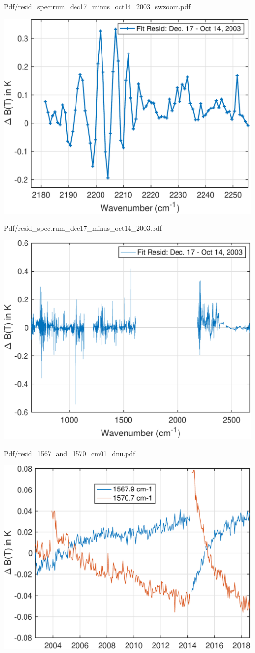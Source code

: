 \documentclass[presentation]{beamer}
\begin{document}
\begin{frame}[label={sec:org6f90b9b}]{Pdf/resid\_spectrum\_dec17\_minus\_oct14\_2003\_swzoom.pdf}
\begin{center}
\includegraphics[width=0.7\linewidth]{./Figs/Pdf/resid_spectrum_dec17_minus_oct14_2003_swzoom.pdf}
\end{center}
\end{frame}

\begin{frame}[label={sec:org790fa7c}]{Pdf/resid\_spectrum\_dec17\_minus\_oct14\_2003.pdf}
\begin{center}
\includegraphics[width=0.7\linewidth]{./Figs/Pdf/resid_spectrum_dec17_minus_oct14_2003.pdf}
\end{center}
\end{frame}

\begin{frame}[label={sec:org2038cf0}]{Pdf/resid\_1567\_and\_1570\_cm01\_dnu.pdf}
\begin{center}
\includegraphics[width=0.7\linewidth]{./Figs/Pdf/resid_1567_and_1570_cm01_dnu.pdf}
\end{center}
\end{frame}
\end{document}
